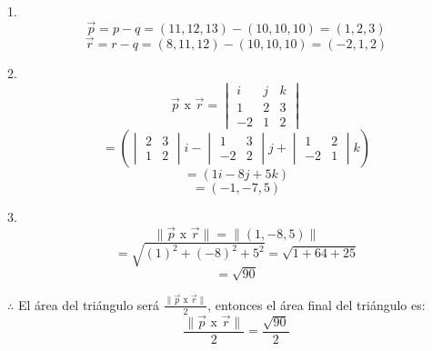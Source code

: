 \documentclass{article}
\begin{document}
\begin{minipage}{0.5cm}
    1. 
    $$\vec{p} = p - q= (11,12,13)-(10,10,10) =(1,2,3)$$
    $$\vec{r} = r- q = (8, 11, 12)-(10,10,10) =(-2, 1, 2)$$
\end{minipage}\hspace*{8cm}\begin{minipage}{0.5cm}
    2. 
    $$\vec{p} \text{ x } \vec{r} = \begin{vmatrix}
        i & j & k \\
        1 & 2 & 3 \\
        -2 & 1 & 2
    \end{vmatrix}$$
    $$= \left(\begin{vmatrix}
        2 & 3 \\
        1 & 2
    \end{vmatrix}i - \begin{vmatrix}
        1 & 3 \\
        -2 & 2 
    \end{vmatrix}j + \begin{vmatrix}
        1 & 2 \\
        -2 & 1
    \end{vmatrix}k\right)$$
    $$=(1i -8j+ 5k)$$
    $$=(-1, -7, 5)$$
\end{minipage}
\begin{center}
    \begin{minipage}{0.5cm}
        3. 
        $$\|\vec{p} \text{ x } \vec{r} \| =\|(1,-8,5)\|$$
        $$=\sqrt{(1)^2+(-8)^2+5^2} = \sqrt{1+ 64+ 25}$$
        $$=\sqrt{90}$$
    \end{minipage}
\end{center}
\vspace{10pt}

$\therefore$ El área del triángulo será $\frac{\|\vec{p} \text{ x } \vec{r} \|}{2}$, entonces el área final del triángulo es: 
$$\frac{\|\vec{p} \text{ x } \vec{r} \|}{2} = \frac{\sqrt{90}}{2}$$
\end{document}
